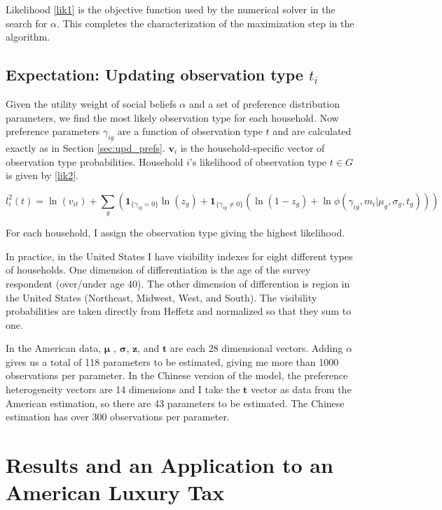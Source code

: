 Likelihood \eqref{lik1} is the objective function used by the numerical solver in the search for $\alpha$.  This completes the characterization of the maximization step in the algorithm.

\subsection{Expectation: Updating observation type $t_i$} 

Given the utility weight of social beliefs $\alpha$ and a set of preference distribution parameters, we find the most likely observation type for each household. Now preference parameters $\gamma_{ig}$ are a function of observation type $t$ and are calculated exactly as in Section \ref{sec:upd_prefs}. $\mathbf{v}_i$ is the household-specific vector of observation type probabilities.  Household $i$'s likelihood of observation type $t \in G$ is given by \eqref{lik2}.

\begin{equation}
    \label{lik2}
    l_i^2(t) = \ln(v_{it}) + \sum_{g} \left(\mathbf{1}_{\{\gamma_{ig} = 0\}}\ln\left(z_g\right) + \mathbf{1}_{\{\gamma_{ig} \neq 0\}} \left(\ln\left(1-z_g\right)+\ln \phi(\gamma_{ig}, m_i|\mu_g,\sigma_g,t_g)\right)\right)
\end{equation}

For each household, I assign the observation type giving the highest likelihood.

In practice, in the United States I have visibility indexes for eight different types of households.  One dimension of differentiation is the age of the survey respondent (over/under age 40). The other dimension of differention is region in the United States (Northeast, Midwest, West, and South).  The visibility probabilities are taken directly from Heffetz and normalized so that they sum to one.

In the American data, $\mathbf{\mu}$ , $\mathbf{\sigma}$, $\mathbf{z}$, and $\mathbf{t}$ are each 28 dimensional vectors. Adding $\alpha$ gives us a total of 118 parameters to be estimated, giving me more than 1000 observations per parameter.  In the Chinese version of the model, the preference heterogeneity vectors are 14 dimensions and I take the $\mathbf{t}$ vector as data from the American estimation, so there are 43 parameters to be estimated.  The Chinese estimation has over 300 observations per parameter.

\section{Results and an Application to an American Luxury Tax}
\label{sec:results}

